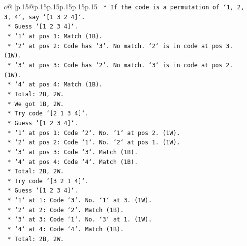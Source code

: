 \documentclass{article}
\begin{document}
{\begin{supertabular}{c@{$\;$}|p{.15\linewidth}@{}p{.15\linewidth}p{.15\linewidth}p{.15\linewidth}p{.15\linewidth}p{.15\linewidth}}
{{{\texttt{                            *   If the code is a permutation of `1, 2, 3, 4`, say `{[}1 3 2 4{]}`.} \\
\texttt{                                *   Guess `{[}1 2 3 4{]}`.} \\
\texttt{                                *   `1` at pos 1: Match (1B).} \\
\texttt{                                *   `2` at pos 2: Code has `3`. No match. `2` is in code at pos 3. (1W).} \\
\texttt{                                *   `3` at pos 3: Code has `2`. No match. `3` is in code at pos 2. (1W).} \\
\texttt{                                *   `4` at pos 4: Match (1B).} \\
\texttt{                                *   Total: 2B, 2W.} \\
\texttt{                                *   We got 1B, 2W.} \\
\texttt{                            *   Try code `{[}2 1 3 4{]}`.} \\
\texttt{                                *   Guess `{[}1 2 3 4{]}`.} \\
\texttt{                                *   `1` at pos 1: Code `2`. No. `1` at pos 2. (1W).} \\
\texttt{                                *   `2` at pos 2: Code `1`. No. `2` at pos 1. (1W).} \\
\texttt{                                *   `3` at pos 3: Code `3`. Match (1B).} \\
\texttt{                                *   `4` at pos 4: Code `4`. Match (1B).} \\
\texttt{                                *   Total: 2B, 2W.} \\
\texttt{                            *   Try code `{[}3 2 1 4{]}`.} \\
\texttt{                                *   Guess `{[}1 2 3 4{]}`.} \\
\texttt{                                *   `1` at 1: Code `3`. No. `1` at 3. (1W).} \\
\texttt{                                *   `2` at 2: Code `2`. Match (1B).} \\
\texttt{                                *   `3` at 3: Code `1`. No. `3` at 1. (1W).} \\
\texttt{                                *   `4` at 4: Code `4`. Match (1B).} \\
\texttt{                                *   Total: 2B, 2W.} \\
}}}
\end{supertabular}}
\end{document}

